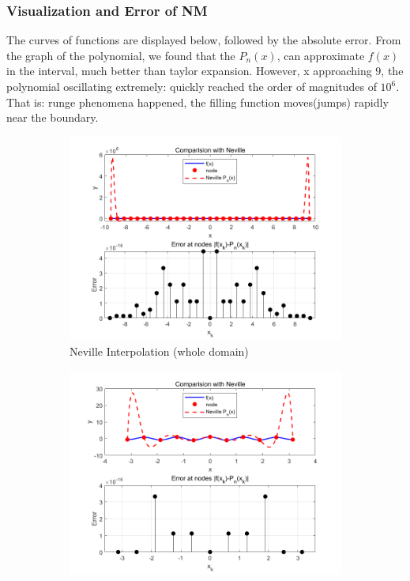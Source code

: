 \documentclass[11pt]{article}
\begin{document}
\subsubsection{Visualization and Error of NM}
The curves of functions are displayed below, followed by the absolute error. From the graph of the polynomial, we found that the
$P_n(x)$, can approximate $f(x)$ in the interval, much better than taylor expansion. However, x approaching ${9}$, the polynomial oscillating 
extremely: quickly reached the order of magnitudes of $10^{6}$. That is: runge phenomena happened, the filling function moves(jumps) rapidly near 
the boundary.
\FloatBarrier

\begin{figure}[H]
  \centering
  \begin{subfigure}[t]{0.48\textwidth}
    \centering
    \includegraphics[width=\textwidth]{Neville.png}
    \caption{Neville Interpolation (whole domain)}
    \label{fig:nev_whole}
  \end{subfigure}
  \hfill
  \begin{subfigure}[t]{0.48\textwidth}
    \centering
    \includegraphics[width=\textwidth]{Neville1.png}

\end{subfigure}
\end{figure}
\end{document}
